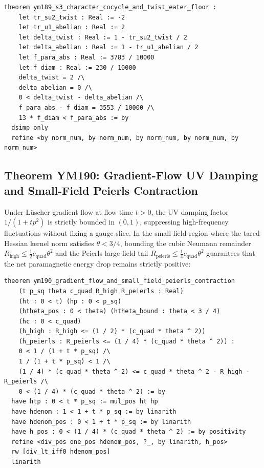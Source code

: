 \documentclass[11pt,a4paper]{article}
\theoremstyle{definition}
\begin{document}
\begin{lstlisting}[language=Lean4]
theorem ym189_s3_character_cocycle_and_twist_eater_floor :
    let tr_su2_twist : Real := -2
    let tr_u1_abelian : Real := 2
    let delta_twist : Real := 1 - tr_su2_twist / 2
    let delta_abelian : Real := 1 - tr_u1_abelian / 2
    let f_para_abs : Real := 3783 / 10000
    let f_diam : Real := 230 / 10000
    delta_twist = 2 /\
    delta_abelian = 0 /\
    0 < delta_twist - delta_abelian /\
    f_para_abs - f_diam = 3553 / 10000 /\
    13 * f_diam < f_para_abs := by
  dsimp only
  refine <by norm_num, by norm_num, by norm_num, by norm_num, by norm_num>
\end{lstlisting}

\subsection{Theorem YM190: Gradient-Flow UV Damping and Small-Field Peierls Contraction}
Under L\"uscher gradient flow at flow time $t > 0$, the UV damping factor $1 / (1 + t p^2)$ is strictly bounded in $(0, 1)$, suppressing high-frequency fluctuations without fixing a gauge slice. In the small-field region where the tared Hessian kernel norm satisfies $\theta < 3/4$, bounding the cubic Neumann remainder $R_{\mathrm{high}} \le \frac{1}{2} c_{\mathrm{quad}} \theta^2$ and the Peierls large-field tail $R_{\mathrm{peierls}} \le \frac{1}{4} c_{\mathrm{quad}} \theta^2$ guarantees that the net paramagnetic energy drop remains strictly positive:

\begin{lstlisting}[language=Lean4]
theorem ym190_gradient_flow_and_small_field_peierls_contraction
    (t p_sq theta c_quad R_high R_peierls : Real)
    (ht : 0 < t) (hp : 0 < p_sq)
    (htheta_pos : 0 < theta) (htheta_bound : theta < 3 / 4)
    (hc : 0 < c_quad)
    (h_high : R_high <= (1 / 2) * (c_quad * theta ^ 2))
    (h_peierls : R_peierls <= (1 / 4) * (c_quad * theta ^ 2)) :
    0 < 1 / (1 + t * p_sq) /\
    1 / (1 + t * p_sq) < 1 /\
    (1 / 4) * (c_quad * theta ^ 2) <= c_quad * theta ^ 2 - R_high - R_peierls /\
    0 < (1 / 4) * (c_quad * theta ^ 2) := by
  have htp : 0 < t * p_sq := mul_pos ht hp
  have hdenom : 1 < 1 + t * p_sq := by linarith
  have hdenom_pos : 0 < 1 + t * p_sq := by linarith
  have h_pos : 0 < (1 / 4) * (c_quad * theta ^ 2) := by positivity
  refine <div_pos one_pos hdenom_pos, ?_, by linarith, h_pos>
  rw [div_lt_iff0 hdenom_pos]
  linarith
\end{lstlisting}
\end{document}
